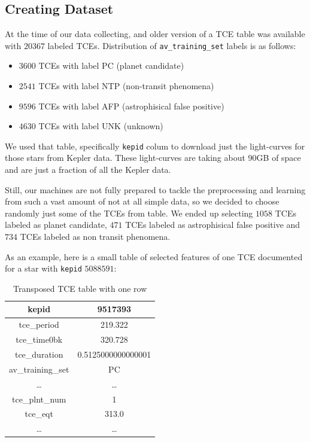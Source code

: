 \documentclass[twoside]{article}
\newcommand{\code}[1]{\texttt{#1}}
\begin{document}
\begin{multicols}{2}
\subsection{Creating Dataset}
At the time of our data collecting, and older version of a TCE table was available with $20367$ labeled TCEs. Distribution of \code{av\_training\_set} labels is as follows:
\begin{itemize}
	\item $3600$ TCEs with label PC (planet candidate)
    \item $2541$ TCEs with label NTP (non-transit phenomena)
    \item $9596$ TCEs with label AFP (astrophisical false positive)
    \item $4630$ TCEs with label UNK (unknown)
\end{itemize}
We used that table, specifically \code{kepid} colum to download just the light-curves for those stars from Kepler data. These light-curves are taking about $90$GB of space and are just a fraction of all the Kepler data.

Still, our machines are not fully prepared to tackle the preprocessing and learning from such a vast amount of not at all simple data, so we decided to choose randomly just some of the TCEs from table. We ended up selecting $1058$ TCEs labeled as planet candidate, $471$ TCEs labeled as astrophisical false positive and $734$ TCEs labeled as non transit phenomena.

As an example, here is a small table of selected features of one TCE documented for a star with \code{kepid} $5088591$:
\begin{table}[H]
\centering
  \begin{tabular}{||c | c||} 
    \hline
    kepid & 9517393 \\
    \hline
    tce\_period & 219.322 \\
    \hline
    tce\_time0bk & 320.728 \\
    \hline
    tce\_duration & 0.5125000000000001 \\
    \hline
    av\_training\_set & PC \\
    \hline
    \ldots & \ldots \\
    \hline
    tce\_plnt\_num & 1 \\
    \hline
    tce\_eqt & 313.0 \\
    \hline
    \ldots & \ldots
  \end{tabular}
  \caption{Transposed TCE table with one row}
\end{table}


\end{multicols}
\end{document}
